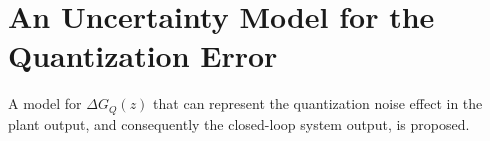 \documentclass{sig-alternate-05-2015}
\newcommand{\red}[1]{{\color{red}#1}}
\begin{document}


\section{An Uncertainty Model for the Quantization Error} 
\label{sec:uncertainty-model-quantization-error}

%

A model for $\Delta{G_{Q}(z)}$ that can represent the quantization
noise effect in the plant output, and consequently the closed-loop system
output, is proposed.  
\end{document}
